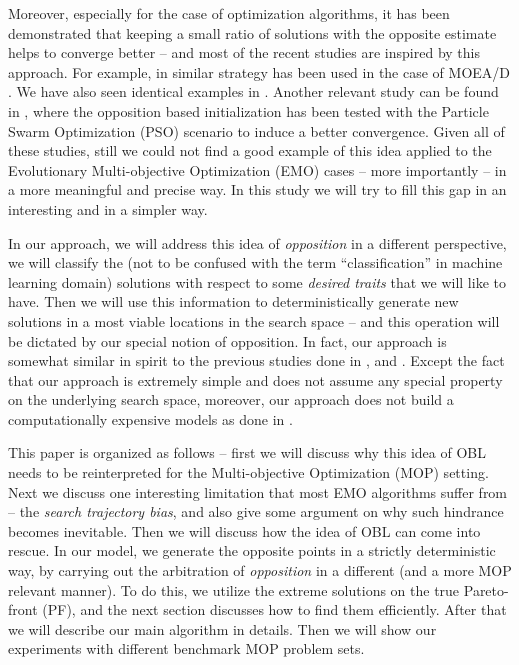 \documentclass[journal]{IEEEtran}
\begin{document}
Moreover, especially for the case of optimization algorithms, it has been demonstrated that keeping a small ratio of solutions with the opposite estimate helps to converge better \cite{opbil} -- and most of the recent studies are inspired by this approach. For example, in \cite{omoead} similar strategy has been used in the case of MOEA/D \cite{moead-main}. We have also seen identical examples in \cite{omode}. Another relevant study can be found in \cite{opso}, where the opposition based initialization has been tested with the Particle Swarm Optimization (PSO) scenario to induce a better convergence. Given all of these studies, still we could not find a good example of this idea applied to the Evolutionary Multi-objective Optimization (EMO) cases -- more importantly -- in a more meaningful and precise way. In this study we will try to fill this gap in an interesting and in a simpler way. 

In our approach, we will address this idea of \textit{opposition} in a different perspective, we will classify the (not to be confused with the term ``classification'' in machine learning domain) solutions with respect to some \textit{desired traits} that we will like to have. Then we will use this information to deterministically generate new solutions in a most viable locations in the search space -- and this operation will be dictated by our special notion of opposition. In fact, our approach is somewhat similar in spirit to the previous studies done in \cite{sts-1}, \cite{sts-2} and \cite{directional-mutation}. Except the fact that our approach is extremely simple and does not assume any special property on the underlying search space, moreover, our approach does not build a computationally expensive models as done in \cite{search-history}\cite{segment-search}.

This paper is organized as follows -- first we will discuss why this idea of OBL needs to be reinterpreted for the Multi-objective Optimization (MOP) setting. Next we discuss one interesting limitation that most EMO algorithms suffer from -- the \textit{search trajectory bias}, and also give some argument on why such hindrance becomes inevitable. Then we will discuss how the idea of OBL can come into rescue. In our model, we generate the opposite points in a strictly deterministic way, by carrying out the arbitration of \textit{opposition} in a different (and a more MOP relevant manner). To do this, we utilize the extreme solutions on the true Pareto-front (PF), and the next section discusses how to find them efficiently. After that we will describe our main algorithm in details. Then we will show our experiments with different benchmark MOP problem sets. 
\end{document}
